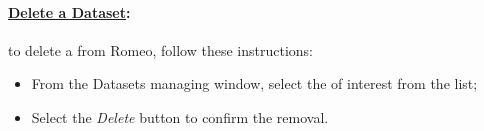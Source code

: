 \paragraph{\underline{Delete a Dataset}:} to delete a \dataset{} from Romeo, follow these instructions:
\begin{itemize}
\item From the Datasets\g{} managing window, select the \dataset{} of interest from the list;
\item Select the \textit{Delete} button to confirm the removal.
\end{itemize}

\pagebreak